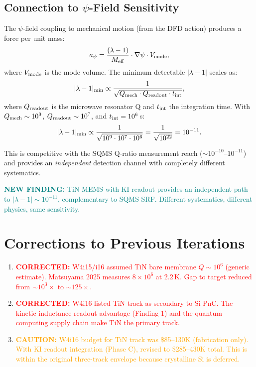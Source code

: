 \documentclass[11pt]{article}
\theoremstyle{remark}
\newcommand{\ee}[1]{\times 10^{#1}}
\newcommand{\Meff}{M_{\rm eff}}
\newcommand{\Qmech}{Q_{\rm mech}}
\newcommand{\corrected}[1]{\textcolor{red}{\textbf{CORRECTED:} #1}}
\newcommand{\caution}[1]{\textcolor{orange}{\textbf{CAUTION:} #1}}
\newcommand{\newfinding}[1]{\textcolor{teal}{\textbf{NEW FINDING:} #1}}
\begin{document}
\subsection{Connection to $\psi$-Field Sensitivity}

The $\psi$-field coupling to mechanical motion (from the DFD action)
produces a force per unit mass:
\begin{equation}
  a_\psi = \frac{(\lambda - 1)}{\Meff} \cdot \nabla \psi \cdot V_{\rm mode},
\end{equation}
where $V_{\rm mode}$ is the mode volume. The minimum detectable
$|\lambda - 1|$ scales as:
\begin{equation}
  |\lambda - 1|_{\rm min} \propto \frac{1}{\sqrt{\Qmech \cdot Q_{\rm readout}
  \cdot t_{\rm int}}},
\end{equation}
where $Q_{\rm readout}$ is the microwave resonator Q and $t_{\rm int}$ the
integration time. With $\Qmech \sim 10^9$, $Q_{\rm readout} \sim 10^7$,
and $t_{\rm int} = 10^6$\,s:
\begin{equation}
  |\lambda - 1|_{\rm min} \propto \frac{1}{\sqrt{10^9 \cdot 10^7 \cdot 10^6}}
  = \frac{1}{\sqrt{10^{22}}} = 10^{-11}.
\end{equation}

This is competitive with the SQMS Q-ratio measurement reach
($\sim 10^{-10}$--$10^{-11}$) and provides an \emph{independent}
detection channel with completely different systematics.

\newfinding{TiN MEMS with KI readout provides an independent path to
$|\lambda - 1| \sim 10^{-11}$, complementary to SQMS SRF. Different
systematics, different physics, same sensitivity.}


\section{Corrections to Previous Iterations}
\label{sec:corrections}

\begin{enumerate}
  \item \corrected{W4i15/i16 assumed TiN bare membrane $Q \sim 10^6$
    (generic estimate). Matsuyama 2025 measures $8\ee{6}$ at 2.2\,K.
    Gap to target reduced from $\sim 10^3\times$ to $\sim 125\times$.}

  \item \corrected{W4i16 listed TiN track as secondary to Si PnC.
    The kinetic inductance readout advantage (Finding 1) and the
    quantum computing supply chain make TiN the primary track.}

  \item \caution{W4i16 budget for TiN track was \$85--130K (fabrication
    only). With KI readout integration (Phase C), revised to \$285--430K
    total. This is within the original three-track envelope because
    crystalline Si is deferred.}
\end{enumerate}
\end{document}
